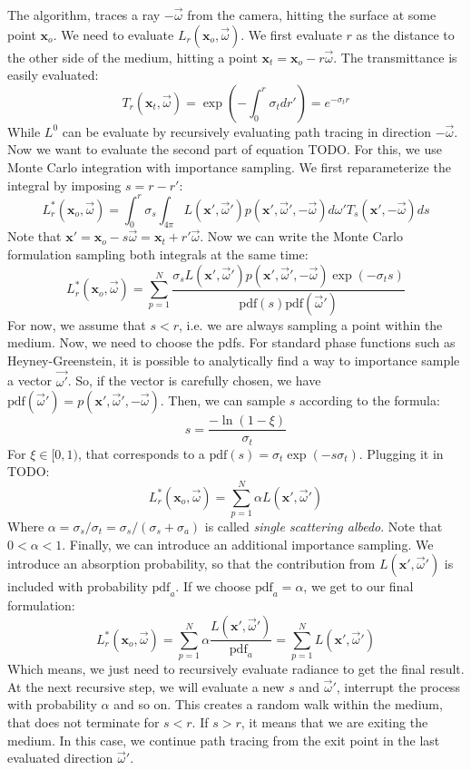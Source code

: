 The algorithm, traces a ray $-\vec{\omega}$ from the camera, hitting the surface at some point $\mathbf{x}_o$. We need to evaluate $L_r(\mathbf{x}_o, \vec{\omega})$. We first evaluate $r$ as the distance to the other side of the medium, hitting a point $\mathbf{x}_t = \mathbf{x}_o - r \vec{\omega}$. The transmittance is easily evaluated:
$$
T_r(\mathbf{x}_t, \vec{\omega}) = \exp\left(-\int_0^r \sigma_t dr'\right) = e^{-\sigma_t r}
$$
While $L^0$ can be evaluate by recursively evaluating path tracing in direction $-\vec{\omega}$. Now we want to evaluate the second part of equation TODO. For this, we use Monte Carlo integration with importance sampling. We first reparameterize the integral by imposing $s = r - r'$:
$$
L_r^*(\mathbf{x}_o, \vec{\omega}) = \int_0^r \sigma_s \int_{4\pi} L(\mathbf{x}', \vec{\omega}') p(\mathbf{x}', \vec{\omega}', -\vec{\omega})  d\omega' T_{s}(\mathbf{x}', -\vec{\omega})  ds
$$
Note that $\mathbf{x}' = \mathbf{x}_o - s \vec{\omega} = \mathbf{x}_t + r' \vec{\omega}$. Now we can write the Monte Carlo formulation sampling both integrals at the same time:
$$
L_r^*(\mathbf{x}_o, \vec{\omega}) = \sum_{p=1}^N \frac{\sigma_s L(\mathbf{x}', \vec{\omega}') p(\mathbf{x}', \vec{\omega}', -\vec{\omega}) \exp(-\sigma_t s)}{\text{pdf}(s) \text{pdf}(\vec{\omega}')}
$$
For now, we assume that $s < r$, i.e. we are always sampling a point within the medium. Now, we need to choose the pdfs. For standard phase functions such as Heyney-Greenstein, it is possible to analytically find a way to importance sample a vector $\vec{\omega'}$. So, if the vector is carefully chosen, we have $\text{pdf}(\vec{\omega}') = p(\mathbf{x}', \vec{\omega}', -\vec{\omega})$. Then, we can sample $s$ according to the formula:
$$
s = \frac{-\ln(1 - \xi)}{\sigma_t}
$$
For $\xi \in [0,1)$, that corresponds to a $\text{pdf}(s) = \sigma_t \exp(-s \sigma_t)$. Plugging it in TODO:
$$
L_r^*(\mathbf{x}_o, \vec{\omega}) = \sum_{p=1}^N \alpha L(\mathbf{x}', \vec{\omega}')
$$
Where $\alpha = \sigma_s / \sigma_t = \sigma_s / (\sigma_s + \sigma_a)  $ is called \emph{single scattering albedo}. Note that $0 < \alpha < 1$.  Finally, we can introduce an additional importance sampling. We introduce an absorption probability, so that the contribution from $L(\mathbf{x}', \vec{\omega}')$ is included with probability $\text{pdf}_a$. If we choose $\text{pdf}_a = \alpha$, we get to our final formulation:
$$
L_r^*(\mathbf{x}_o, \vec{\omega}) = \sum_{p=1}^N \alpha \frac{L(\mathbf{x}', \vec{\omega}')} {\text{pdf}_a} = \sum_{p=1}^N  L(\mathbf{x}', \vec{\omega}') 
$$
Which means, we just need to recursively evaluate radiance to get the final result. At the next recursive step, we will evaluate a new $s$ and $\vec{\omega}'$, interrupt the process with probability $\alpha$ and so on. This creates a random walk within the medium, that does not terminate for $s < r$. If $s > r$, it means that we are exiting the medium. In this case, we continue path tracing from the exit point in the last evaluated direction $\vec{\omega}'$.

